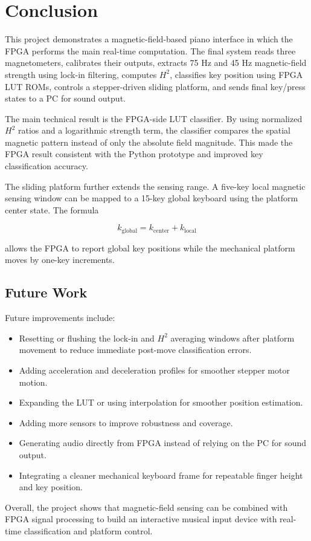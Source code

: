 \section{Conclusion}
\label{sec:conclusion}

This project demonstrates a magnetic-field-based piano interface in which the FPGA performs the main real-time computation. The final system reads three magnetometers, calibrates their outputs, extracts 75 Hz and 45 Hz magnetic-field strength using lock-in filtering, computes $H^2$, classifies key position using FPGA LUT ROMs, controls a stepper-driven sliding platform, and sends final key/press states to a PC for sound output.

The main technical result is the FPGA-side LUT classifier. By using normalized $H^2$ ratios and a logarithmic strength term, the classifier compares the spatial magnetic pattern instead of only the absolute field magnitude. This made the FPGA result consistent with the Python prototype and improved key classification accuracy.

The sliding platform further extends the sensing range. A five-key local magnetic sensing window can be mapped to a 15-key global keyboard using the platform center state. The formula

\begin{equation}
    k_{\mathrm{global}} = k_{\mathrm{center}} + k_{\mathrm{local}}
\end{equation}

allows the FPGA to report global key positions while the mechanical platform moves by one-key increments.

\subsection{Future Work}

Future improvements include:

\begin{itemize}
    \item Resetting or flushing the lock-in and $H^2$ averaging windows after platform movement to reduce immediate post-move classification errors.
    \item Adding acceleration and deceleration profiles for smoother stepper motor motion.
    \item Expanding the LUT or using interpolation for smoother position estimation.
    \item Adding more sensors to improve robustness and coverage.
    \item Generating audio directly from FPGA instead of relying on the PC for sound output.
    \item Integrating a cleaner mechanical keyboard frame for repeatable finger height and key position.
\end{itemize}

Overall, the project shows that magnetic-field sensing can be combined with FPGA signal processing to build an interactive musical input device with real-time classification and platform control.
